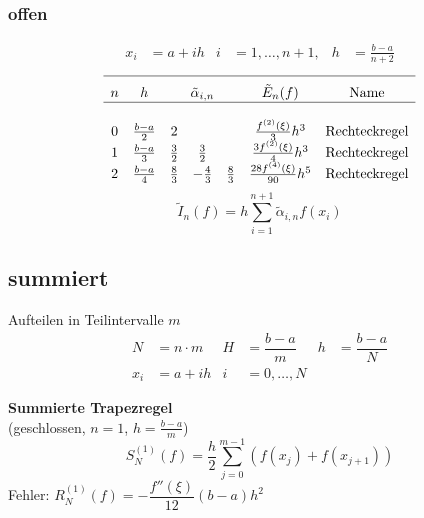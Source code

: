 \documentclass[
ngerman,
accentcolor=9c,%
type=intern,
marginpar=false
]{tudapub}
\begin{document}
            \subsubsection{offen}
                \begin{align*}
                    x_i &= a+ih &  i&=1,\dots,n+1, &  h&=\frac{b-a}{n+2}
                \end{align*}
                \begin{equation*}
                    \begin{array}{c c c c c c c}
                        \hline\\[-.5\normalbaselineskip]
                        n & h & \multicolumn{3}{c}{\tilde{\alpha}_{i,n}}& \tilde{E}_n (f) & \text{Name}\\
                        \hline\\
                        0 & \frac{b-a}{2} & 2 & & & \frac{f^{(2)}(\xi)}{3}h^3 & \text{Rechteckregel}\\
                        1 & \frac{b-a}{3} & \frac{3}{2} & \frac{3}{2} & & \frac{3f^{(2)}(\xi)}{4}h^3 & \text{Rechteckregel}\\
                        2 & \frac{b-a}{4} & \frac{8}{3} & -\frac{4}{3} & \frac{8}{3} & \frac{28f^{(4)}(\xi)}{90}h^5 & \text{Rechteckregel}\\
                    \end{array}
                \end{equation*}
                \begin{equation*}
                    \tilde{I}_n(f) = h \sum^{n+1}_{i=1} \tilde{\alpha}_{i,n} f(x_i)
                \end{equation*}
        \subsection{summiert}
            Aufteilen in Teilintervalle $m$
            \begin{align*}
                N &= n \cdot m & H&= \dfrac{b-a}{m} & h&= \dfrac{b-a}{N}\\
                x_i &=  a + ih & i&= 0,\dots, N
            \end{align*}

            \textbf{Summierte Trapezregel}\\
            (geschlossen, $n=1$, $h  = \frac{b-a}{m}$)
            \begin{equation*}
                S^{(1)}_N(f) = \dfrac{h}{2} \sum_{j=0}^{m-1}(f(x_j) + f(x_{j+1}))
            \end{equation*}
            Fehler: $R^{(1)}_N(f)=-\dfrac{f''(\xi)}{12}(b-a)h^2$\\[2ex]
\end{document}
